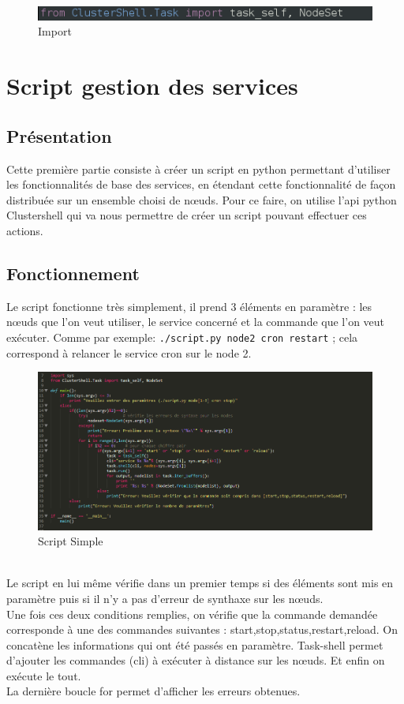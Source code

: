 \documentclass[a4paper,11pt]{article}
\begin{document}
\begin{figure}[hbtp]
\centering
\includegraphics[scale=0.7]{from_clustershell.png}
\caption{Import}
\end{figure}

\pagebreak
\section{Script gestion des services}
\label{sec:section3}
\subsection{Présentation}
\label{sub:3.1}
\noindent
Cette première partie consiste à créer un script en python permettant d'utiliser les fonctionnalités de base des services, en étendant cette fonctionnalité de façon distribuée sur un ensemble choisi de nœuds.
Pour ce faire, on utilise l'api python Clustershell qui va nous permettre de créer un script pouvant effectuer ces actions.


\subsection{Fonctionnement}
\label{sub:3.2}
\noindent
Le script fonctionne très simplement, il prend 3 éléments en paramètre : les nœuds que l’on veut utiliser, le service concerné et la commande que l’on veut exécuter. Comme par exemple:
\smallbreak 
\verb?./script.py node2 cron restart? ; cela correspond à relancer le service cron sur le node 2.
\\
\begin{figure}[hbtp]
\centering
\includegraphics[scale=0.7]{script1.png}
\caption{Script Simple}
\end{figure}
\\
Le script en lui même vérifie dans un premier temps si des éléments sont mis en paramètre puis si il n’y a pas d’erreur de synthaxe sur les nœuds.
\\
Une fois ces deux conditions remplies, on vérifie que la commande demandée corresponde à une des commandes suivantes : start,stop,status,restart,reload. On concatène les informations qui ont été passés en paramètre. Task-shell permet d’ajouter les commandes (cli) à exécuter à distance sur les nœuds. Et enfin on exécute le tout.
\\
La dernière boucle for permet d'afficher les erreurs obtenues.
\end{document}
